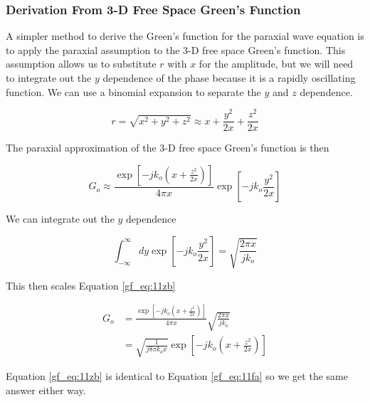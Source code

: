 \subsubsection{Derivation From 3-D Free Space Green's Function}
A simpler method to derive the Green's function for the paraxial wave equation is to apply the paraxial assumption to the 3-D free space Green's function. This assumption allows us to substitute $r$ with $x$ for the amplitude, but we will need to integrate out the $y$ dependence of the phase because it is a rapidly oscillating function. We can use a binomial expansion to separate the $y$ and $z$ dependence.

\begin{equation}
r = \sqrt{x^2+y^2+z^2} \approx x + \frac{y^2}{2x}+\frac{z^2}{2x}
\label{gf_eq:11za}
\end{equation}
 \renewcommand{\baselinestretch}{2} \small\normalsize
 
\noindent The paraxial approximation of the 3-D free space Green's function is then

\begin{equation}
G_o \approx \frac{\exp\left[-jk_o\left(x+\frac{z^2}{2x} \right)\right]}{4\pi x} \exp\left[-jk_o\frac{y^2}{2x}\right]
\label{gf_eq:11zb}
\end{equation}
 \renewcommand{\baselinestretch}{2} \small\normalsize
 
\noindent We can integrate out the $y$ dependence

\begin{equation}
\int_{-\infty}^{\infty} dy \exp\left[-jk_o\frac{y^2}{2x}\right] = \sqrt{\frac{2\pi x}{jk_o}}
\label{gf_eq:11zc}
\end{equation}
 \renewcommand{\baselinestretch}{2} \small\normalsize
 
\noindent This then scales Equation \ref{gf_eq:11zb}

\begin{equation}
\begin{aligned}
G_o &= \frac{\exp\left[-jk_o\left(x+\frac{z^2}{2x} \right)\right]}{4\pi x} \sqrt{\frac{2\pi x}{jk_o}}\\
&= \sqrt{\frac{1}{j8\pi k_o x}}\exp\left[-jk_o\left(x+\frac{z^2}{2x} \right)\right]
\label{gf_eq:11zd}
\end{aligned}
\end{equation}
 \renewcommand{\baselinestretch}{2} \small\normalsize
 
\noindent Equation \ref{gf_eq:11zb} is identical to Equation \ref{gf_eq:11fa} so we get the same answer either way.

